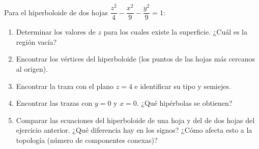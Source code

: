 Para el hiperboloide de dos hojas $\dfrac{z^2}{4} - \dfrac{x^2}{9} - \dfrac{y^2}{9} = 1$:
\begin{enumerate}
    \item Determinar los valores de $z$ para los cuales existe la superficie. ¿Cuál es la región vacía?
    \item Encontrar los vértices del hiperboloide (los puntos de las hojas más cercanos al origen).
    \item Encontrar la traza con el plano $z = 4$ e identificar su tipo y semiejes.
    \item Encontrar las trazas con $y = 0$ y $x = 0$. ¿Qué hipérbolas se obtienen?
    \item Comparar las ecuaciones del hiperboloide de una hoja y del de dos hojas del ejercicio anterior. ¿Qué diferencia hay en los signos? ¿Cómo afecta esto a la topología (número de componentes conexas)?
\end{enumerate}